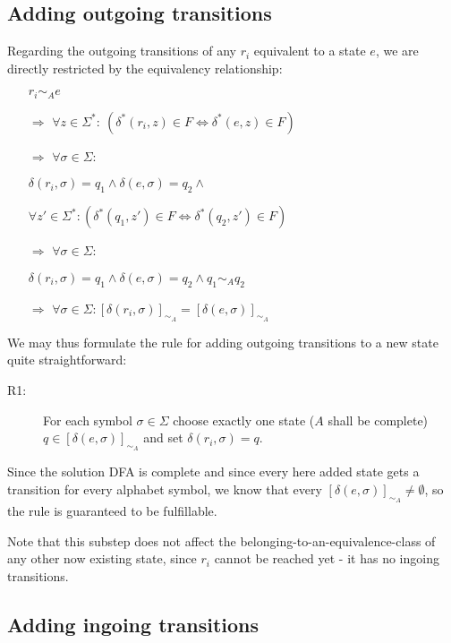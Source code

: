 \subsection{Adding outgoing transitions}

Regarding the outgoing transitions of any $r_i$ equivalent to a state $e$, we are directly restricted by the equivalency relationship:
\begin{itemize}
	\item[] $r_i \sim_A e$
	\item[$\Rightarrow$] $\forall z \in \Sigma^* \colon\ (\delta^*(r_i, z) \in F \Leftrightarrow \delta^*(e, z) \in F)$
	
	\item[$\Rightarrow$] $\forall \sigma \in \Sigma \colon$
	
	\qquad $\delta(r_i, \sigma) = q_1 \land \delta(e, \sigma) = q_2 \land$
	
	\qquad $\forall z' \in \Sigma^*\colon (\delta^*(q_1, z') \in F \Leftrightarrow \delta^*(q_2, z') \in F)$
	
	\item[$\Rightarrow$] $\forall \sigma \in \Sigma \colon$
	
	\qquad $\delta(r_i, \sigma) = q_1 \land \delta(e, \sigma) = q_2 \land q_1 \sim_A q_2$
	
	\item[$\Rightarrow$] $\forall \sigma \in \Sigma \colon [\delta(r_i, \sigma)]_{\sim_A} = [\delta(e, \sigma)]_{\sim_A}$
\end{itemize}
We may thus formulate the rule for adding outgoing transitions to a new state quite straightforward:
\begin{description}
	\item[R1:] For each symbol $\sigma \in \Sigma$ choose exactly one state ($A$ shall be complete) $q\in[\delta(e, \sigma)]_{\sim_A}$ and set $\delta(r_i, \sigma) = q$.
\end{description}
Since the solution DFA is complete and since every here added state gets a transition for every alphabet symbol, we know that every $[\delta(e, \sigma)]_{\sim_A} \neq \emptyset$, so the rule is guaranteed to be fulfillable.

Note that this substep does not affect the belonging-to-an-equivalence-class of any other now existing state, since $r_i$ cannot be reached yet - it has no ingoing transitions.

\subsection{Adding ingoing transitions}

